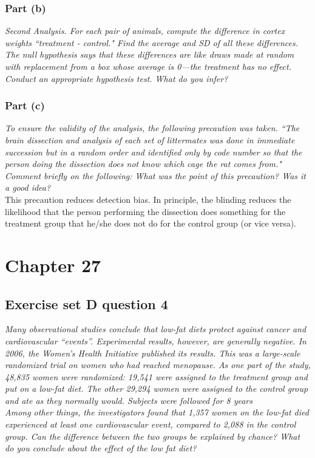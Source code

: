 \documentclass[11pt]{article}
\begin{document}
\subsubsection*{Part (b)}
\textit{Second Analysis.
For each pair of animals, compute the difference in cortex weights ``treatment - control."
Find the average and SD of all these differences.
The null hypothesis says that these differences are like draws made at random with replacement from a box whose average is 0---the treatment has no effect.
Conduct an appropriate hypothesis test.
What do you infer?}

\subsubsection*{Part (c)}
\textit{To ensure the validity of the analysis, the following precaution was taken.
``The brain dissection and analysis of each set of littermates was done in immediate succession but in a random order and identified only by code number so that the person doing the dissection does not know which cage the rat comes from."
Comment briefly on the following: What was the point of this precaution?
Was it a good idea?}\\

This precaution reduces detection bias.  In principle, the blinding reduces the likelihood that the person performing the dissection does something for the treatment group that he/she does not do for the control group (or vice versa).


\section*{Chapter 27}
\subsection*{Exercise set D question 4} %
\noindent \textit{ Many observational studies conclude that low-fat diets protect against cancer and cardiovascular ``events''. Experimental results, however, are generally negative. In 2006, the Women's Health Initiative published its results. This was a large-scale randomized trial on women who had reached menopause. As one part of the study, 48,835 women were randomized: 19,541 were assigned to the treatment group and put on a low-fat diet. The other 29,294 women were assigned to the control group and ate as they normally would. Subjects were followed for 8 years\\
\noindent Among other things, the investigators found that 1,357 women on the low-fat died experienced at least one cardiovascular event, compared to 2,088 in the control group. Can the difference between the two groups be explained by chance? What do you conclude about the effect of the low fat diet?}\\
\end{document}
